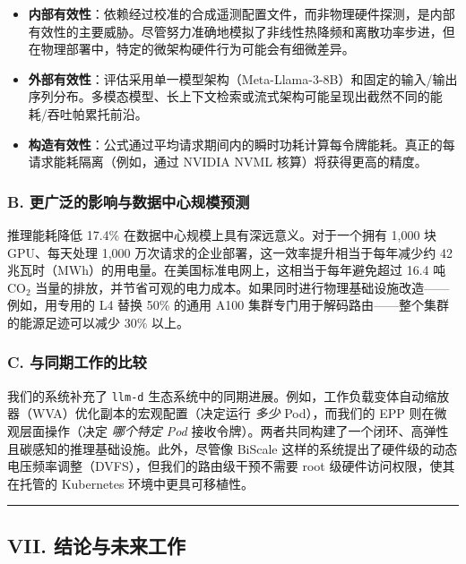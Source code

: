 \begin{itemize}
    \item \textbf{内部有效性}：依赖经过校准的合成遥测配置文件，而非物理硬件探测，是内部有效性的主要威胁。尽管努力准确地模拟了非线性热降频和离散功率步进，但在物理部署中，特定的微架构硬件行为可能会有细微差异。
    \item \textbf{外部有效性}：评估采用单一模型架构（Meta-Llama-3-8B）和固定的输入/输出序列分布。多模态模型、长上下文检索或流式架构可能呈现出截然不同的能耗/吞吐帕累托前沿。
    \item \textbf{构造有效性}：公式通过平均请求期间内的瞬时功耗计算每令牌能耗。真正的每请求能耗隔离（例如，通过 NVIDIA NVML 核算）将获得更高的精度。
\end{itemize}

\subsubsection{B. 更广泛的影响与数据中心规模预测}\label{b.-broader-impact-and-datacenter-scale-projections}

推理能耗降低 17.4\% 在数据中心规模上具有深远意义。对于一个拥有 1,000 块 GPU、每天处理 1,000 万次请求的企业部署，这一效率提升相当于每年减少约 42 兆瓦时（MWh）的用电量。在美国标准电网上，这相当于每年避免超过 16.4 吨 CO\(_2\) 当量的排放，并节省可观的电力成本。如果同时进行物理基础设施改造——例如，用专用的 L4 替换 50\% 的通用 A100 集群专门用于解码路由——整个集群的能源足迹可以减少 30\% 以上。

\subsubsection{C. 与同期工作的比较}\label{c.-comparison-with-concurrent-work}

我们的系统补充了 \texttt{llm-d} 生态系统中的同期进展。例如，工作负载变体自动缩放器（WVA）优化副本的宏观配置（决定运行 \emph{多少} Pod），而我们的 EPP 则在微观层面操作（决定 \emph{哪个特定 Pod} 接收令牌）。两者共同构建了一个闭环、高弹性且碳感知的推理基础设施。此外，尽管像 BiScale 这样的系统提出了硬件级的动态电压频率调整（DVFS），但我们的路由级干预不需要 root 级硬件访问权限，使其在托管的 Kubernetes 环境中更具可移植性。

\begin{center}\rule{0.5\linewidth}{0.5pt}\end{center}

\subsection{VII. 结论与未来工作}\label{vii.-conclusion-and-future-work}

